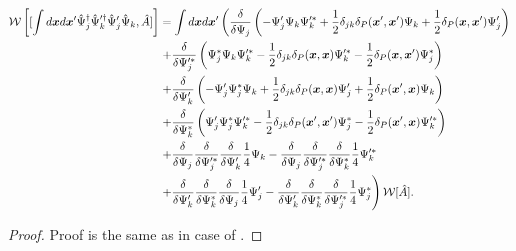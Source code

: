\begin{theorem}
\begin{equation*}
\begin{split}
	\mathcal{W} \left[
		[
			\int d\boldsymbol{x} d\boldsymbol{x}^\prime
			\hat{\Psi}_j^\dagger \hat{\Psi}_k^{\prime\dagger} \hat{\Psi}_j^\prime \hat{\Psi}_k,
			\hat{A}
		]
	\right]
	& = \int d\boldsymbol{x} d\boldsymbol{x}^\prime \left(
		\frac{\delta}{\delta \Psi_j} \left(
			- \Psi_j^\prime \Psi_k \Psi_k^{\prime*}
			+ \frac{1}{2} \delta_{jk} \delta_P(\boldsymbol{x}^\prime, \boldsymbol{x}^\prime) \Psi_k
			+ \frac{1}{2} \delta_P(\boldsymbol{x}, \boldsymbol{x}^\prime) \Psi_j^\prime
		\right) \right . \\
	&	\left. + \frac{\delta}{\delta \Psi_j^{\prime*}} \left(
			\Psi_j^* \Psi_k \Psi_k^{\prime*}
			- \frac{1}{2} \delta_{jk} \delta_P(\boldsymbol{x}, \boldsymbol{x}) \Psi_k^{\prime*}
			- \frac{1}{2} \delta_P(\boldsymbol{x}, \boldsymbol{x}^\prime) \Psi_j^*
		\right) \right. \\
	&	\left. + \frac{\delta}{\delta \Psi_k^\prime} \left(
			- \Psi_j^\prime \Psi_j^* \Psi_k
			+ \frac{1}{2} \delta_{jk} \delta_P(\boldsymbol{x}, \boldsymbol{x}) \Psi_j^\prime
			+ \frac{1}{2} \delta_P(\boldsymbol{x}^\prime, \boldsymbol{x}) \Psi_k
		\right) \right .\\
	&	\left. + \frac{\delta}{\delta \Psi_k^*} \left(
			\Psi_j^\prime \Psi_j^* \Psi_k^{\prime*}
			- \frac{1}{2} \delta_{jk} \delta_P(\boldsymbol{x}^\prime, \boldsymbol{x}^\prime) \Psi_j^*
			- \frac{1}{2} \delta_P(\boldsymbol{x}^\prime, \boldsymbol{x}) \Psi_k^{\prime*}
		\right) \right. \\
	&	\left.
			+ \frac{\delta}{\delta \Psi_j}
			\frac{\delta}{\delta \Psi_j^{\prime*}}
			\frac{\delta}{\delta \Psi_k^\prime}
			\frac{1}{4} \Psi_k
			- \frac{\delta}{\delta \Psi_j}
			\frac{\delta}{\delta \Psi_j^{\prime*}}
			\frac{\delta}{\delta \Psi_k^*}
			\frac{1}{4} \Psi_k^{\prime*}
		\right. \\
	&	\left.
			+ \frac{\delta}{\delta \Psi_k^\prime}
			\frac{\delta}{\delta \Psi_k^*}
			\frac{\delta}{\delta \Psi_j}
			\frac{1}{4} \Psi_j^\prime
			- \frac{\delta}{\delta \Psi_k^\prime}
			\frac{\delta}{\delta \Psi_k^*}
			\frac{\delta}{\delta \Psi_j^{\prime*}}
			\frac{1}{4} \Psi_j^*
	\right) \mathcal{W}[\hat{A}].
\end{split}
\end{equation*}
\end{theorem}
\begin{proof}
Proof is the same as in case of .
\end{proof}